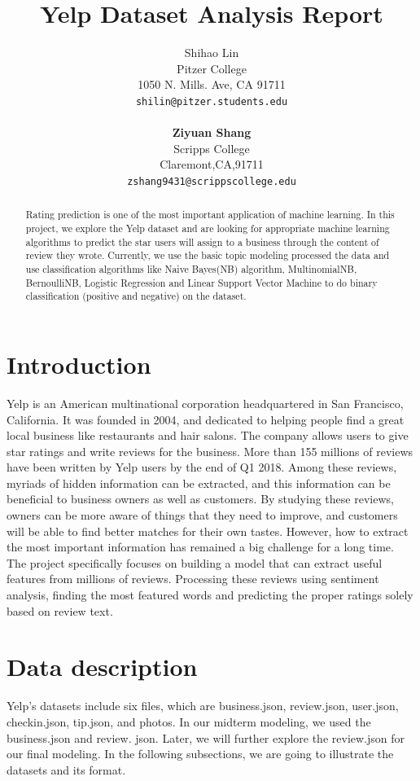 \documentclass{article}
\title{Yelp Dataset Analysis Report }
\author{
  Shihao Lin \\
  Pitzer College\\
  1050 N. Mills. Ave, CA 91711 \\
  \texttt{shilin@pitzer.students.edu} \\
  \\
   \textbf{Ziyuan Shang} \\
   Scripps College\\
   Claremont,CA,91711 \\
   \texttt{zshang9431@scrippscollege.edu} \\
 }
\begin{document}

\maketitle
\begin{abstract}
  Rating prediction is one of the most important
application of machine learning. In this project, 
we explore the Yelp dataset and are looking for appropriate machine learning algorithms to predict the star users will assign to a business through the content of review they wrote. Currently, we use the basic topic modeling processed the data and use classification algorithms like Naive Bayes(NB) algorithm, MultinomialNB, BernoulliNB, Logistic Regression and Linear Support Vector Machine to do binary classification (positive and negative) on the dataset. 
\end{abstract}

\section{Introduction}
Yelp is an American multinational corporation headquartered in San Francisco, California. It was founded in 2004, and dedicated to helping people find a great local business like restaurants and hair salons. The company allows users to give star ratings and write reviews for the business. More than 155 millions of reviews have been written by Yelp users by the end of Q1 2018. Among these reviews, myriads of hidden information can be extracted, and this information can be beneficial to business owners as well as customers. By studying these reviews, owners can be more aware of things that they need to improve, and customers will be able to find better matches for their own tastes. However, how to extract the most important information has remained a big challenge for a long time. The project specifically focuses on building a model that can extract useful features from millions of reviews. Processing these reviews using sentiment analysis, finding the most featured words and predicting the proper ratings solely based on review text.

\section{Data description}

Yelp's datasets include six files, which are business.json, review.json, user.json, checkin.json, tip.json, and photos. In our midterm modeling, we used the business.json and review. json. Later, we will further explore the review.json for our final modeling. In the following subsections, we are going to illustrate the datasets and its format.
\end{document}
